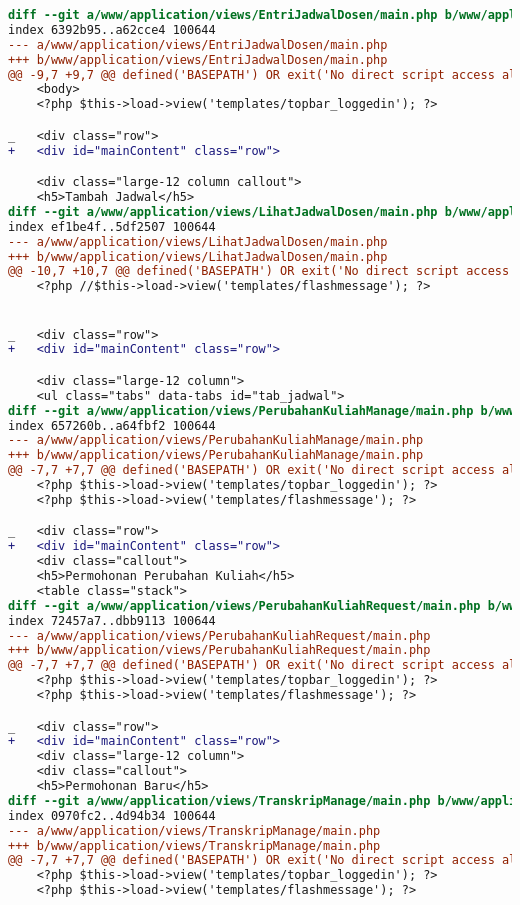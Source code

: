 \begin{lstlisting}[frame=single, label={lst:perbaikan_2.4.1_bypass_blocks}, language=diff, caption=Perbaikan Kriteria Sukses 2.4.1]
diff --git a/www/application/views/EntriJadwalDosen/main.php b/www/application/views/EntriJadwalDosen/main.php
index 6392b95..a62cce4 100644
--- a/www/application/views/EntriJadwalDosen/main.php
+++ b/www/application/views/EntriJadwalDosen/main.php
@@ -9,7 +9,7 @@ defined('BASEPATH') OR exit('No direct script access allowed');
    <body>
    <?php $this->load->view('templates/topbar_loggedin'); ?>

_   <div class="row">
+   <div id="mainContent" class="row">

    <div class="large-12 column callout">
    <h5>Tambah Jadwal</h5>
diff --git a/www/application/views/LihatJadwalDosen/main.php b/www/application/views/LihatJadwalDosen/main.php
index ef1be4f..5df2507 100644
--- a/www/application/views/LihatJadwalDosen/main.php
+++ b/www/application/views/LihatJadwalDosen/main.php
@@ -10,7 +10,7 @@ defined('BASEPATH') OR exit('No direct script access allowed');
    <?php //$this->load->view('templates/flashmessage'); ?>


_   <div class="row">
+   <div id="mainContent" class="row">

    <div class="large-12 column">
    <ul class="tabs" data-tabs id="tab_jadwal">
diff --git a/www/application/views/PerubahanKuliahManage/main.php b/www/application/views/PerubahanKuliahManage/main.php
index 657260b..a64fbf2 100644
--- a/www/application/views/PerubahanKuliahManage/main.php
+++ b/www/application/views/PerubahanKuliahManage/main.php
@@ -7,7 +7,7 @@ defined('BASEPATH') OR exit('No direct script access allowed');
    <?php $this->load->view('templates/topbar_loggedin'); ?>
    <?php $this->load->view('templates/flashmessage'); ?>

_   <div class="row">
+   <div id="mainContent" class="row">
    <div class="callout">
    <h5>Permohonan Perubahan Kuliah</h5>
    <table class="stack">
diff --git a/www/application/views/PerubahanKuliahRequest/main.php b/www/application/views/PerubahanKuliahRequest/main.php
index 72457a7..dbb9113 100644
--- a/www/application/views/PerubahanKuliahRequest/main.php
+++ b/www/application/views/PerubahanKuliahRequest/main.php
@@ -7,7 +7,7 @@ defined('BASEPATH') OR exit('No direct script access allowed');
    <?php $this->load->view('templates/topbar_loggedin'); ?>
    <?php $this->load->view('templates/flashmessage'); ?>

_   <div class="row">
+   <div id="mainContent" class="row">
    <div class="large-12 column">
    <div class="callout">
    <h5>Permohonan Baru</h5>
diff --git a/www/application/views/TranskripManage/main.php b/www/application/views/TranskripManage/main.php
index 0970fc2..4d94b34 100644
--- a/www/application/views/TranskripManage/main.php
+++ b/www/application/views/TranskripManage/main.php
@@ -7,7 +7,7 @@ defined('BASEPATH') OR exit('No direct script access allowed');
    <?php $this->load->view('templates/topbar_loggedin'); ?>
    <?php $this->load->view('templates/flashmessage'); ?>


\end{lstlisting}
